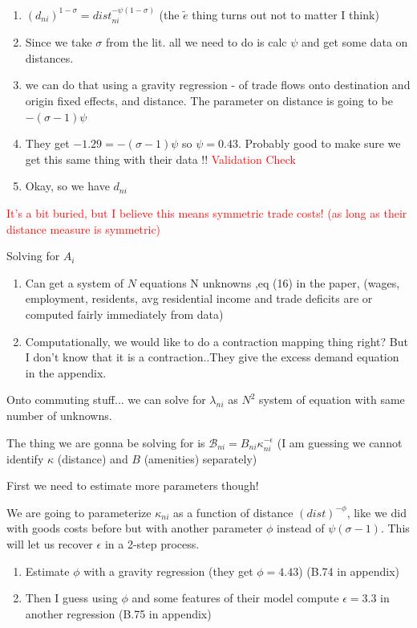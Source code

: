 \documentclass{article}
\begin{document}
\begin{enumerate}
\item $(d_{ni})^{1-\sigma} = dist_{ni}^{-\psi (1-\sigma)} $ (the $\tilde e$ thing turns out not to matter I think)
\item Since we take $\sigma$ from the lit. all we need to do is calc $\psi$ and get some data on distances.
\item we can do that using a gravity regression - of trade flows onto destination and origin fixed effects, and distance. The parameter on distance is going to be 
$-(\sigma-1)\psi$
\item They get $-1.29 = -(\sigma-1)\psi$ so $\psi = 0.43$. Probably good to make sure we get this same thing with their data !! \textcolor{red}{Validation Check}
\item Okay, so we have $d_{ni}$
\end{enumerate}
\textcolor{red}{It's a bit buried, but I believe this means symmetric trade costs! (as long as their distance measure is symmetric)}

Solving for $A_i$
\begin{enumerate}
\item Can get a system of $N$ equations N unknowns ,eq (16) in the paper,  (wages, employment, residents, avg residential income and trade deficits are or computed fairly immediately from data)
\item Computationally, we would like to do a contraction mapping thing right? But I don't know that it is a contraction..They give the excess demand equation in the appendix. 
\end{enumerate}

Onto commuting stuff... we can solve for $\lambda_{ni}$ as $N^2$ system of equation with same number of unknowns.


The thing we are gonna be solving for is $\mathcal{B}_{ni} = B_{ni}\kappa_{ni}^{-\epsilon}$ (I am guessing we cannot identify $\kappa$ (distance) and $B$ (amenities) separately)



First we need to estimate more parameters though!

We are going to parameterize $\kappa_{ni}$ as a function of distance $(dist)^{-\phi}$, like we did with goods costs before but with another parameter $\phi$ instead of $\psi(\sigma-1)$. This will let us recover $\epsilon$ in a 2-step process. 

\begin{enumerate}
\item Estimate $\phi$ with a gravity regression (they get $\phi = 4.43$) (B.74 in appendix)
 \item Then I guess using $\phi$ and some features of their model compute $\epsilon=3.3$ in another regression (B.75 in appendix)
\end{enumerate}
\end{document}
